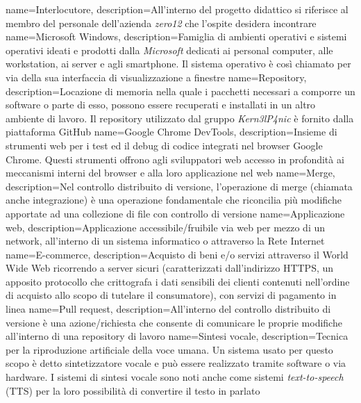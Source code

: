  {
	name=Interlocutore,
	description={All'interno del progetto didattico si riferisce al membro del personale dell'azienda \textit{zero12} che l'ospite desidera incontrare}
}
 {
	name=Microsoft Windows,
	description={Famiglia di ambienti operativi e sistemi operativi ideati e prodotti dalla \textit{Microsoft} dedicati ai personal computer, alle workstation, ai server e agli smartphone. Il sistema operativo è così chiamato per via della sua interfaccia di visualizzazione a finestre}
}
 {
	name=Repository,
	description={Locazione di memoria nella quale i pacchetti necessari a comporre un software o parte di esso, possono essere recuperati e installati in un altro ambiente di lavoro. Il repository utilizzato dal gruppo \textit{Kern3lP4nic} è fornito dalla piattaforma GitHub}
}
 {
	name=Google Chrome DevTools,
	description={Insieme di strumenti web per i test ed il debug di codice integrati nel browser Google Chrome. Questi strumenti offrono agli sviluppatori web accesso in profondità ai meccanismi interni del browser e alla loro applicazione nel web}
}
 {
	name=Merge,
	description={Nel controllo distribuito di versione, l'operazione di merge (chiamata anche integrazione) è una operazione fondamentale che riconcilia più modifiche apportate ad una collezione di file con controllo di versione}
}
 {
	name=Applicazione web,
	description={Applicazione accessibile/fruibile via web per mezzo di un network, all'interno di un sistema informatico o attraverso la Rete Internet}
}
 {
	name=E-commerce,
	description={Acquisto di beni e/o servizi attraverso il World Wide Web ricorrendo a server sicuri (caratterizzati dall'indirizzo HTTPS, un apposito protocollo che crittografa i dati sensibili dei clienti contenuti nell'ordine di acquisto allo scopo di tutelare il consumatore), con servizi di pagamento in linea}
}
 {
	name=Pull request,
	description={All'interno del controllo distribuito di versione è una azione/richiesta che consente di comunicare le proprie modifiche all'interno di una repository di lavoro}
}
 {
	name=Sintesi vocale,
	description={Tecnica per la riproduzione artificiale della voce umana. Un sistema usato per questo scopo è detto sintetizzatore vocale e può essere realizzato tramite software o via hardware. I sistemi di sintesi vocale sono noti anche come sistemi \textit{text-to-speech} (TTS) per la loro possibilità di convertire il testo in parlato}
}
